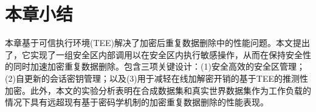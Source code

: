\section{本章小结}
\label{sec:sgxdedup-sgxdedup-conclusion}

本章基于可信执行环境(TEE)解决了加密后重复数据删除中的性能问题。本文提出了\sysnameS，它实现了一组安全区内部调用以在安全区内执行敏感操作，从而在保持安全性的同时加速加密重复数据删除。\sysnameS 包含三项关键设计：(1)安全高效的安全区管理；(2)自更新的会话密钥管理；以及(3)用于减轻在线加解密开销的基于TEE的推测性加密。此外，本文的实验分析表明\sysnameS 在合成数据集和真实世界数据集作为工作负载的情况下具有远超现有基于密码学机制的加密重复数据删除的性能表现。
